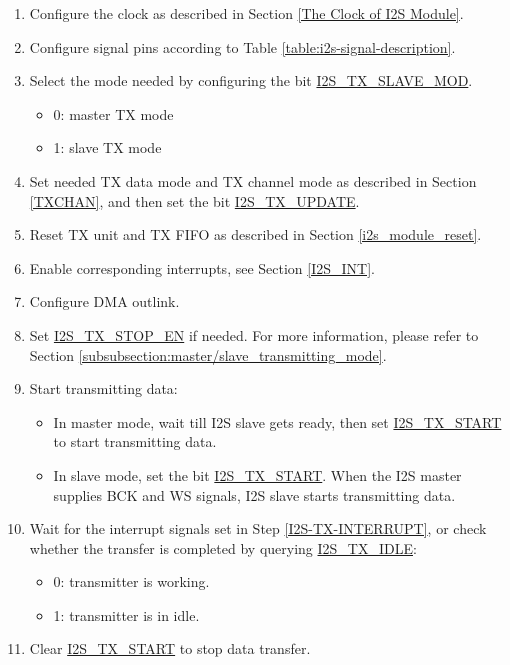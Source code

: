 \documentclass[main\_\_CN.tex]{subfiles}
\begin{document}
\begin{enumerate}
    \item Configure the clock as described in Section  \ref{The Clock of I2S Module}.

    \item Configure signal pins according to Table  \ref{table:i2s-signal-description}.

    \item Select the mode needed by configuring the bit  \hyperref[fielddesc:I2STXSLAVEMOD]{I2S\_TX\_SLAVE\_MOD}.
    \begin{itemize}
        \item 0: master TX mode
        \item 1: slave TX mode
    \end{itemize}

    \item Set needed TX data mode and TX channel mode as described in Section  \ref{TXCHAN}, and then set the bit  \hyperref[fielddesc:I2STXUPDATE]{I2S\_TX\_UPDATE}.

    \item Reset TX unit and TX FIFO as described in Section  \ref{i2s_module_reset}.
    \item Enable corresponding interrupts, see Section  \ref{I2S_INT}.\label{I2S-TX-INTERRUPT}
    \item Configure DMA outlink.

    \item Set  \hyperref[fielddesc:I2STXSTOPEN]{I2S\_TX\_STOP\_EN} if needed. For more information, please refer to Section  \ref{subsubsection:master/slave_transmitting_mode}.

    \item Start transmitting data:
    \begin{itemize}
        \item In master mode, wait till I2S slave gets ready, then set  \hyperref[fielddesc:I2STXSTART]{I2S\_TX\_START} to start transmitting data.
        \item In slave mode, set the bit  \hyperref[fielddesc:I2STXSTART]{I2S\_TX\_START}. When the I2S master supplies BCK and WS signals, I2S slave starts transmitting data.
    \end{itemize}

    \item Wait for the interrupt signals set in Step  \ref{I2S-TX-INTERRUPT}, or check whether the transfer is completed by querying  \hyperref[fielddesc:I2STXIDLE]{I2S\_TX\_IDLE}:
    \begin{itemize}
        \item 0: transmitter is working.
        \item 1: transmitter is in idle.
    \end{itemize}

    \item Clear  \hyperref[fielddesc:I2STXSTART]{I2S\_TX\_START} to stop data transfer.
\end{enumerate}
\end{document}
